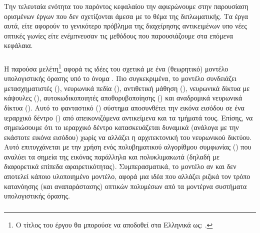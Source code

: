 Την τελευταία ενότητα του παρόντος κεφαλαίου την αφιερώνουμε στην παρουσίαση ορισμένων έργων που δεν σχετίζονται άμεσα με το θέμα της διπλωματικής. Τα έργα αυτά, είτε αφορούν το γενικότερο πρόβλημα της διαχείρησης αντικειμένων υπο νέες οπτικές γωνίες είτε ενέμπνευσαν τις μεθόδους που παρουσιάζουμε στα επόμενα κεφάλαια.

\subsubsection{}

Η παρούσα μελέτη\footnote{Ο τίτλος του έργου θα μπορούσε να αποδοθεί στα Ελληνικά ως: .} \cite{hinton2021represent_GLOM} αφορά τις ιδέες του  σχετικά με ένα (θεωρητικό) μοντέλο υπολογιστικής όρασης υπό το όνομα . Πιο συγκεκριμένα, το μοντέλο συνδειάζει μετασχηματιστές (), νευρωνικά πεδία (), αντιθετική μάθηση (), νευρωνικά δίκτυα με κάψουλες (), αυτοκωδικοποιητές αποθορυβοποίησης () και αναδρομικά νευρωνικά δίκτυα (). Αυτό το φανταστικό () σύστημα αποσυνθέτει την εικόνα εισόδου σε ένα ιεραρχικό δέντρο () από απεικονιζόμενα αντικείμενα και τα τμήματά τους. Επίσης, να σημειώσουμε ότι το ιεραρχικό δέντρο κατασκευάζεται δυναμικά (ανάλογα με την εκάστοτε εικόνα εισόδου) χωρίς να αλλάζει η αρχιτεκτονική του νευρωνικού δικτύου. Αυτό επιτυγχάνεται με την χρήση ενός πολυβηματικού αλγορίθμου συμφωνίας () που αναλύει τα σημεία της εικόνας παράλληλα και πολυκλιμακωτά (δηλαδή με διαφορετικά επίπεδα αφαιρετικότητας). Συμπερασματικά, το μοντέλο  αν και δεν αποτελεί κάποιο υλοποιημένο μοντέλο, αφορά μια ιδέα που αλλάζει ριζικά τον τρόπο κατανόησης (και αναπαράστασης) οπτικών πολυμέσων από τα μοντέρνα συστήματα υπολογιστικής όρασης. 


\subsubsection{}

